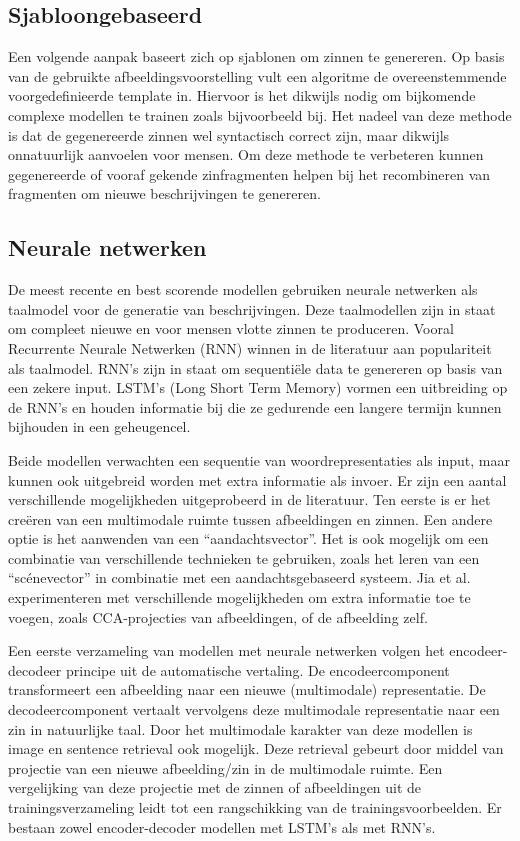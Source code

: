 \subsection{Sjabloongebaseerd}
Een volgende aanpak baseert zich op sjablonen om zinnen te genereren. Op basis van de gebruikte afbeeldingsvoorstelling vult een algoritme de overeenstemmende voorgedefinieerde template in.\cite{Yang2011} Hiervoor is het dikwijls nodig om bijkomende complexe modellen te trainen zoals bijvoorbeeld bij\cite{Elliott2013}. Het nadeel van deze methode is dat de gegenereerde zinnen wel syntactisch correct zijn, maar dikwijls onnatuurlijk aanvoelen voor mensen. Om deze methode te verbeteren kunnen gegenereerde of vooraf gekende zinfragmenten helpen bij het recombineren van fragmenten om nieuwe beschrijvingen te genereren. \cite{Mitchell2012,Kuznetsova2012}

\subsection{Neurale netwerken}
De meest recente en best scorende modellen gebruiken neurale netwerken als taalmodel voor de generatie van beschrijvingen. Deze taalmodellen zijn in staat om compleet nieuwe en voor mensen vlotte zinnen te produceren. Vooral Recurrente Neurale Netwerken (RNN)\cite{Mikolov2010} winnen in de literatuur aan populariteit als taalmodel. RNN's zijn in staat om sequenti\"ele data te genereren op basis van een zekere input. LSTM's (Long Short Term Memory)\cite{SeppHochreiter1997} vormen een uitbreiding op de RNN's en houden informatie bij die ze gedurende een langere termijn kunnen bijhouden in een geheugencel. 

Beide modellen verwachten een sequentie van woordrepresentaties als input, maar kunnen ook uitgebreid worden met extra informatie als invoer. Er zijn een aantal verschillende mogelijkheden uitgeprobeerd in de literatuur. Ten eerste is er het cre\"eren van een multimodale ruimte tussen afbeeldingen en zinnen\cite{Kiros2014,Socher2014}. Een andere optie is het aanwenden van een ``aandachtsvector''.\cite{Xu2015} Het is ook mogelijk om een combinatie van verschillende technieken te gebruiken, zoals het leren van een ``sc\'enevector'' in combinatie met een aandachtsgebaseerd systeem\cite{Jin2015}. Jia et al. experimenteren met verschillende mogelijkheden om extra informatie toe te voegen, zoals CCA-projecties van afbeeldingen, of de afbeelding zelf\cite{Fernando2015}.

Een eerste verzameling van modellen met neurale netwerken volgen het encodeer-decodeer principe uit de automatische vertaling.\cite{Kiros2014} De encodeercomponent transformeert een afbeelding naar een nieuwe (multimodale) representatie. De decodeercomponent vertaalt vervolgens deze multimodale representatie naar een zin in natuurlijke taal. Door het multimodale karakter van deze modellen is image en sentence retrieval ook mogelijk. Deze retrieval gebeurt door middel van projectie van een nieuwe afbeelding/zin in de multimodale ruimte. Een vergelijking van deze projectie met de zinnen of afbeeldingen uit de trainingsverzameling leidt tot een rangschikking van de trainingsvoorbeelden. Er bestaan zowel encoder-decoder modellen met LSTM's\cite{Kiros2014} als met RNN's\cite{Karpathy2014,Mao2014a}.

